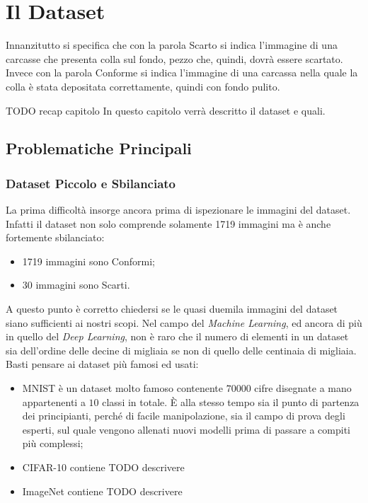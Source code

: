 
\chapter{Il Dataset}

Innanzitutto si specifica che con la parola Scarto si indica l'immagine di una carcasse che presenta colla sul fondo, pezzo che, quindi, dovrà essere scartato.
Invece con la parola Conforme si indica l'immagine di una carcassa nella quale la colla è stata depositata correttamente, quindi con fondo pulito.

TODO recap capitolo
In questo capitolo verrà descritto il dataset e quali.


\section{Problematiche Principali}

\subsection{Dataset Piccolo e Sbilanciato}
La prima difficoltà insorge ancora prima di ispezionare le immagini del dataset.
Infatti il dataset non solo comprende solamente 1719 immagini ma è anche fortemente sbilanciato:
\begin{itemize}
    \item 1719 immagini sono Conformi;
    \item 30 immagini sono Scarti.
\end{itemize}

A questo punto è corretto chiedersi se le quasi duemila immagini del dataset siano sufficienti ai nostri scopi.
Nel campo del \textit{Machine Learning}, ed ancora di più in quello del \textit{Deep Learning}, non è raro che il numero di elementi in un dataset sia dell'ordine delle decine di migliaia se non di quello delle centinaia di migliaia.
Basti pensare ai dataset più famosi ed usati:
\begin{itemize}
  \item MNIST è un dataset molto famoso contenente $70000$ cifre disegnate a mano appartenenti a $10$ classi in totale.
    È alla stesso tempo sia il punto di partenza dei principianti, perché di facile manipolazione, sia il campo di prova degli esperti, sul quale vengono allenati nuovi modelli prima di passare a compiti più complessi;
  \item CIFAR-10 contiene TODO descrivere 
  \item ImageNet contiene TODO descrivere 
\end{itemize}

